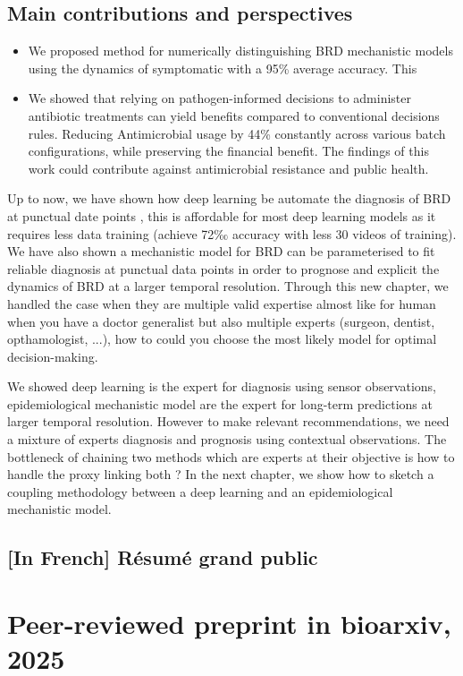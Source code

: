 \subsection{Main contributions and perspectives}

\begin{itemize}
    \item  We proposed method for numerically distinguishing BRD mechanistic models using the dynamics of symptomatic with a 95\% average accuracy. This
    \item We showed that relying on pathogen-informed decisions to administer antibiotic treatments can  yield benefits compared to conventional decisions rules. Reducing Antimicrobial usage by 44\% constantly across various batch configurations, while preserving the financial benefit. The findings of this work could contribute against antimicrobial resistance and public health.
\end{itemize}

Up to now, we have shown how deep learning be automate the diagnosis of BRD at punctual date points , this is affordable for most deep learning models as it requires less data training (achieve 72‰ accuracy with less 30 videos of training). We have also shown a mechanistic model for BRD can be parameterised to fit reliable diagnosis at punctual data points in order to prognose and explicit the dynamics of BRD at a larger temporal resolution.  Through this new chapter, we handled the case when they are multiple valid expertise almost like for human when you have a doctor generalist but also multiple experts (surgeon, dentist, opthamologist, ...), how to could you choose the most likely model for optimal decision-making. 

We showed deep learning is the expert for diagnosis using sensor observations, epidemiological mechanistic model are the expert for long-term predictions at larger temporal resolution. However to make relevant recommendations, we need a mixture of experts diagnosis and prognosis using contextual observations. The bottleneck of chaining two methods which are experts at their objective is how to handle the proxy linking both ? In the next chapter, we show how to sketch a coupling methodology between a deep learning and an epidemiological mechanistic model.



\subsection{[In French] Résumé grand public}



\section{Peer-reviewed preprint in bioarxiv, 2025}


    
